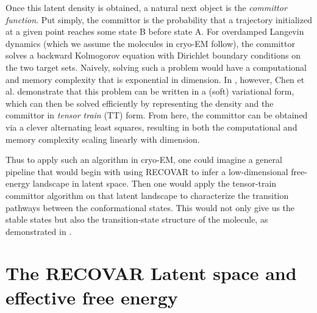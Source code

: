\documentclass[11pt]{amsart}
\begin{document}
Once this latent density is obtained, a natural next object is the \emph{committor function}. Put simply, the committor is the probability that a trajectory initialized at a given point reaches some state B before state A. For overdamped Langevin dynamics (which we assume the molecules in cryo-EM follow), the committor solves a backward Kolmogorov equation with Dirichlet boundary conditions on the two target sets. Naively, solving such a problem would have a computational and memory complexity that is exponential in dimension. In \cite{committor}, however, Chen et al. demonstrate that this problem can be written in a (soft) variational form, which can then be solved efficiently by representing the density and the committor in \emph{tensor train} (TT) form. From here, the committor can be obtained via a clever alternating least squares, resulting in both the computational and memory complexity scaling linearly with dimension.

Thus to apply such an algorithm in cryo-EM, one could imagine a general pipeline that would begin with using RECOVAR to infer a low-dimensional free-energy landscape in latent space. Then one would apply the tensor-train committor algorithm on that latent landscape to characterize the transition pathways between the conformational states. This would not only give us the stable states but also the transition-state structure of the molecule, as demonstrated in .

\section{The RECOVAR Latent space and effective free energy}
\end{document}
